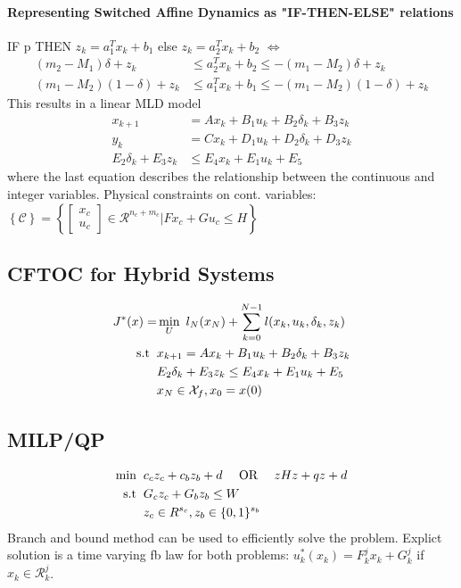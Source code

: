 \documentclass[landscape,a4paper,8pt]{scrartcl}
\newcommand{\mc}[1]{\mathcal{#1}}
\newcommand{\Me}[1]{\begin{bmatrix}#1\end{bmatrix}} %
\begin{document}
\begin{multicols*}{3}
\paragraph{Representing Switched Affine Dynamics as "IF-THEN-ELSE" relations}
IF p THEN $z_k = a_1^Tx_k+b_1$ else $z_k = a_2^Tx_k+b_2$ $\Leftrightarrow$
\begin{align*}
(m_2 - M_1)\delta + z_k &\leq a_2^T x_k + b_2 \leq - (m_1 - M_2)\delta + z_k \\
(m_1 - M_2)(1 -\delta) + z_k &\leq a_1^T x_k + b_1 \leq -(m_1 - M_2)(1 -\delta) + z_k
\end{align*}
This results in a linear MLD model
\begin{align*}
x_{k+1} &= A x_k + B_1 u_k + B_2 \delta_k + B_3 z_k \\
y_k &= C x_k  + D_1 u_k + D_2 \delta_k + D_3 z_k\\
E_2 \delta_k + E_3 z_k &\leq E_4 x_k + E_1 u_k + E_5
\end{align*}
where the last equation describes the relationship between the continuous and integer variables. Physical constraints on cont. variables:
$\left\{\mc{C}\right\} = \left\{ \Me{x_c\\u_c} \in \mc{R}^{n_c+m_c}| F x_c + G u_c \leq H\right\}$
\subsection{CFTOC for Hybrid Systems}
\begin{align*}
J^*(x)=&\min_U ~l_N (x_N) + \sum_{k=0}^{N-1} l(x_k,u_k,\delta_k,z_k)\\
\mathrm{s.t} \hspace*{2mm} & x_{k+1}=A x_k + B_1 u_k + B_2 \delta_k + B_3 z_k\\ &E_2 \delta_k + E_3 z_k \leq E_4 x_k + E_1 u_k + E_5\\&x_N \in \mc{X}_f, x_0 = x(0)
\end{align*}
\subsection{MILP/QP}
\begin{align*}
	\text{min}  \hspace*{2mm} &c_c z_c +  c_b z_b + d \quad \text{ OR } \quad z H z +  q z + d\\
	\mathrm{s.t} \hspace*{2mm} &G_c z_c + G_b z_b \leq W \\
	&z_c \in R^{s_c}, z_b \in\{0, 1\}^{s_b}
\end{align*}
Branch and bound method can be used to efficiently solve the problem.
Explict solution is a time varying fb law for both problems: $u_k^*(x_k) = F^j_k x_k + G_k^j$ if $x_k \in \mc{R}^j_k$.


\end{multicols*}
\end{document}
